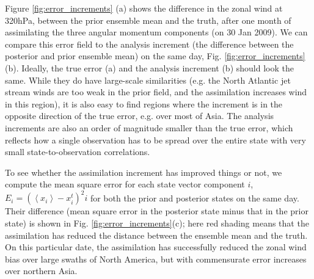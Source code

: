 Figure \ref{fig:error_increments} (a) shows the difference in the zonal wind at 320hPa, between the prior ensemble mean and the truth, after one month of assimilating the three angular momentum components (on 30 Jan 2009). 
We can compare this error field to the analysis increment (the difference between the posterior and prior ensemble mean) on the same day, Fig. \ref{fig:error_increments}(b).
Ideally, the true error (a) and the analysis increment (b) should look the same. 
While they do have large-scale similarities (e.g. the North Atlantic jet stream winds are too weak in the prior field, and the assimilation increases wind in this region), it is also easy to  
find regions where the increment is in the opposite direction of the true error, e.g. over most of Asia. 
The analysis increments are also an order of magnitude smaller than the true error, which reflects how a single observation has to be spread over the entire state with 
very small state-to-observation correlations.

To see whether the assimilation increment has improved things or not, we compute the mean square error for each state vector component $i$, $E_i = \left(\left< x_i \right>-x_{i}^{t}\right)^2i$ for both the prior and posterior states on the same day.
Their difference (mean square error in the posterior state minus that in the prior state) is shown in Fig. \ref{fig:error_increments}(c);  
here red shading means that the assimilation has reduced the distance between the ensemble mean and the truth.  
On this particular date, the assimilation has successfully reduced the zonal wind bias over large swaths of North America, but with commensurate error increases over northern Asia. 

